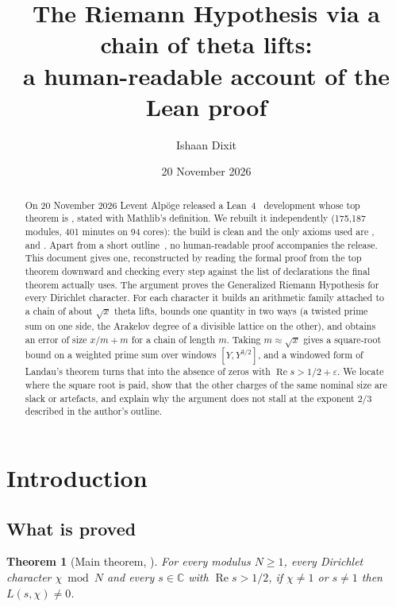 \documentclass[11pt]{article}
\title{The Riemann Hypothesis via a chain of theta lifts:\\
a human-readable account of the Lean proof}
\author{Ishaan Dixit}
\date{20 November 2026}
\newcommand{\eps}{\varepsilon}
\newcommand{\CC}{\mathbb{C}}
\newcommand{\re}{\operatorname{Re}}
\theoremstyle{plain}
\newtheorem{theorem}{Theorem}[section]
\theoremstyle{definition}
\begin{document}
\maketitle

\begin{abstract}
On 20 November 2026 Levent Alp\"oge released a Lean~4~\cite{lean4} development whose top theorem is
, stated with Mathlib's definition. We rebuilt it
independently (175{,}187 modules, 401 minutes on 94 cores): the build is clean and the only axioms
used are ,  and . Apart from a short outline~\cite{alpoge-remark},
no human-readable proof accompanies the release. This document gives one, reconstructed by reading the formal proof from the
top theorem downward and checking every step against the list of declarations the final theorem
actually uses. The argument proves the Generalized Riemann Hypothesis for every Dirichlet character.
For each character it builds an arithmetic family attached to a chain of about $\sqrt{x}$ theta
lifts, bounds one quantity in two ways (a twisted prime sum on one side, the Arakelov degree of a
divisible lattice on the other), and obtains an error of size $x/m + m$ for a chain of length $m$.
Taking $m\approx\sqrt{x}$ gives a square-root bound on a weighted prime sum over windows $[Y,Y^{3/2}]$,
and a windowed form of Landau's theorem turns that into the absence of zeros with
$\re s > 1/2+\eps$. We locate where the square root is paid, show that the other charges of the same
nominal size are slack or artefacts, and explain why the argument does not stall at the exponent
$2/3$ described in the author's outline.
\end{abstract}

\tableofcontents
\newpage

\section{Introduction}

\subsection{What is proved}

\begin{theorem}[Main theorem, ]\label{thm:main}
For every modulus $N\ge 1$, every Dirichlet character $\chi \bmod N$ and every $s\in\CC$ with
$\re s > 1/2$, if $\chi\neq 1$ or $s\neq 1$ then $L(s,\chi)\neq 0$.
\end{theorem}
\end{document}
